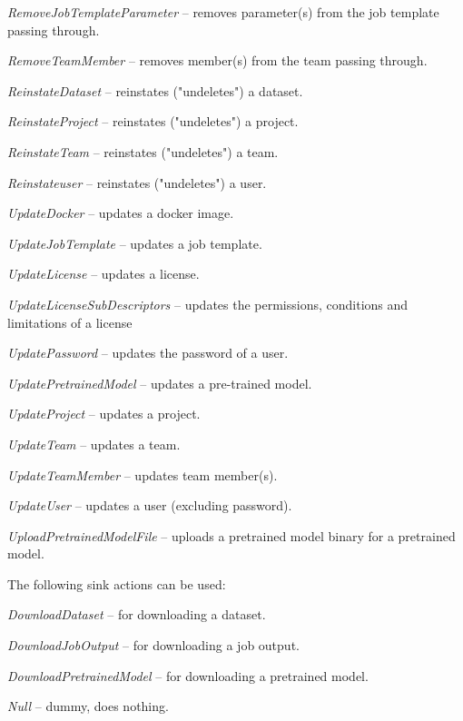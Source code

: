\documentclass[a4paper]{book}
\begin{document}
\begin{tight_itemize}
  \item \textit{RemoveJobTemplateParameter} -- removes parameter(s) from the job template passing through.
  \item \textit{RemoveTeamMember} -- removes member(s) from the team passing through.
  \item \textit{ReinstateDataset} -- reinstates ("undeletes") a dataset.
  \item \textit{ReinstateProject} -- reinstates ("undeletes") a project.
  \item \textit{ReinstateTeam} -- reinstates ("undeletes") a team.
  \item \textit{Reinstateuser} -- reinstates ("undeletes") a user.
  \item \textit{UpdateDocker} -- updates a docker image.
  \item \textit{UpdateJobTemplate} -- updates a job template.
  \item \textit{UpdateLicense} -- updates a license.
  \item \textit{UpdateLicenseSubDescriptors} -- updates the permissions, conditions and limitations of a license
  \item \textit{UpdatePassword} -- updates the password of a user.
  \item \textit{UpdatePretrainedModel} -- updates a pre-trained model.
  \item \textit{UpdateProject} -- updates a project.
  \item \textit{UpdateTeam} -- updates a team.
  \item \textit{UpdateTeamMember} -- updates team member(s).
  \item \textit{UpdateUser} -- updates a user (excluding password).
  \item \textit{UploadPretrainedModelFile} -- uploads a pretrained model binary for a pretrained model.
\end{tight_itemize}
The following sink actions can be used:
\begin{tight_itemize}
  \item \textit{DownloadDataset} -- for downloading a dataset.
  \item \textit{DownloadJobOutput} -- for downloading a job output.
  \item \textit{DownloadPretrainedModel} -- for downloading a pretrained model.
  \item \textit{Null} -- dummy, does nothing.
\end{tight_itemize}
\end{document}
